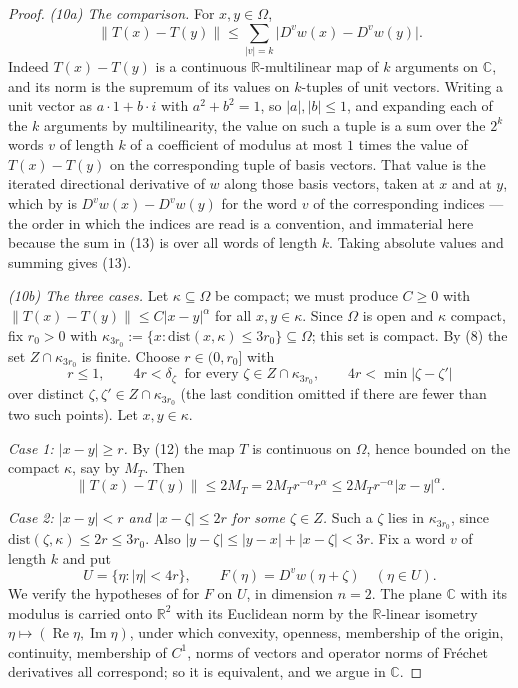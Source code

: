 \begin{proof}
\emph{(10a) The comparison.}  For $x,y\in\Omega$,
\begin{equation}\tag{13}
  \bigl\|T(x)-T(y)\bigr\|\le\sum_{|v|=k}\bigl|D^{v}w(x)-D^{v}w(y)\bigr| .
\end{equation}
Indeed $T(x)-T(y)$ is a continuous $\mathbb{R}$-multilinear map of $k$
arguments on $\mathbb{C}$, and its norm is the supremum of its values on
$k$-tuples of unit vectors.  Writing a unit vector as $a\cdot1+b\cdot i$ with
$a^{2}+b^{2}=1$, so $|a|,|b|\le1$, and expanding each of the $k$ arguments by
multilinearity, the value on such a tuple is a sum over the $2^{k}$ words $v$
of length $k$ of a coefficient of modulus at most $1$ times the value of
$T(x)-T(y)$ on the corresponding tuple of basis vectors.  That value is the
iterated directional derivative of $w$ along those basis vectors, taken at $x$
and at $y$, which by  is $D^{v}w(x)-D^{v}w(y)$ for the
word $v$ of the corresponding indices --- the order in which the indices are
read is a convention, and immaterial here because the sum in (13) is over all
words of length $k$.  Taking absolute values and summing gives (13).

\emph{(10b) The three cases.}  Let $\kappa\subseteq\Omega$ be compact; we must
produce $C\ge0$ with $\|T(x)-T(y)\|\le C|x-y|^{\alpha}$ for all
$x,y\in\kappa$.  Since $\Omega$ is open and $\kappa$ compact, fix $r_0>0$ with
$\kappa_{3r_0}:=\{x:\mathrm{dist}(x,\kappa)\le3r_0\}\subseteq\Omega$; this set
is compact.  By (8) the set $Z\cap\kappa_{3r_0}$ is finite.  Choose
$r\in(0,r_0]$ with
\[
  r\le1,\qquad 4r<\delta_\zeta\ \text{ for every }\zeta\in Z\cap\kappa_{3r_0},
  \qquad 4r<\min|\zeta-\zeta'|
\]
over distinct $\zeta,\zeta'\in Z\cap\kappa_{3r_0}$ (the last condition omitted
if there are fewer than two such points).  Let $x,y\in\kappa$.

\emph{Case 1: $|x-y|\ge r$.}  By (12) the map $T$ is continuous on $\Omega$,
hence bounded on the compact $\kappa$, say by $M_T$.  Then
\[
  \|T(x)-T(y)\|\le2M_T=2M_Tr^{-\alpha}r^{\alpha}\le2M_Tr^{-\alpha}|x-y|^{\alpha}.
\]

\emph{Case 2: $|x-y|<r$ and $|x-\zeta|\le2r$ for some $\zeta\in Z$.}  Such a
$\zeta$ lies in $\kappa_{3r_0}$, since $\mathrm{dist}(\zeta,\kappa)\le2r\le3r_0$.
Also $|y-\zeta|\le|y-x|+|x-\zeta|<3r$.  Fix a word $v$ of length $k$ and put
\[
  U=\{\eta:|\eta|<4r\},\qquad F(\eta)=D^{v}w(\eta+\zeta)\quad(\eta\in U).
\]
We verify the hypotheses of  for $F$ on $U$, in dimension
$n=2$.  The plane $\mathbb{C}$ with its modulus is carried onto
$\mathbb{R}^{2}$ with its Euclidean norm by the $\mathbb{R}$-linear isometry
$\eta\mapsto(\operatorname{Re}\eta,\operatorname{Im}\eta)$, under which
convexity, openness, membership of the origin, continuity, membership of
$C^{1}$, norms of vectors and operator norms of Fréchet derivatives all
correspond; so it is equivalent, and we argue in $\mathbb{C}$.


\end{proof}
